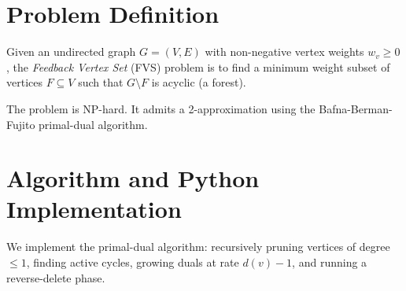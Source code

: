 \documentclass[11pt,oneside]{book}
\begin{document}
\section{Problem Definition}
Given an undirected graph $G = (V, E)$ with non-negative vertex weights $w_v \ge 0$, the \emph{Feedback Vertex Set} (FVS) problem is to find a minimum weight subset of vertices $F \subseteq V$ such that $G \setminus F$ is acyclic (a forest).

The problem is NP-hard. It admits a 2-approximation using the Bafna-Berman-Fujito primal-dual algorithm.

\section{Algorithm and Python Implementation}
We implement the primal-dual algorithm: recursively pruning vertices of degree $\le 1$, finding active cycles, growing duals at rate $d(v) - 1$, and running a reverse-delete phase.
\end{document}

